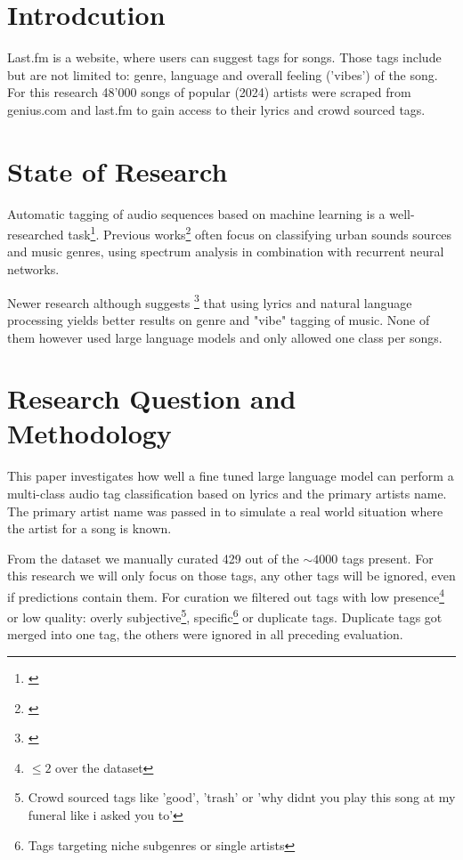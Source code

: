 \documentclass[a4paper,12pt]{scrartcl}
\begin{document}



\pagebreak
\begin{multicols}{2}
\section{Introdcution}
Last.fm is a website, where users can suggest tags for songs. Those tags include but are not limited to: genre, language and overall feeling ('vibes') of the song. For this research 48'000 songs of popular (2024) artists were scraped from genius.com and last.fm to gain access to their lyrics and crowd sourced tags.

\section{State of Research}
Automatic tagging of audio sequences based on machine learning is a well-researched task\footnote[1]{\cite{mckinney_features_2003}}. 
Previous works\footnote[2]{\cite{fonseca_audio_2020, pons_musicnn_2019, schmid_efficient_2023,xu_general_2019}} often focus on classifying urban sounds sources and music genres, using spectrum analysis in combination with recurrent neural networks. 

Newer research although suggests \footnote[3]{\cite{tsaptsinos_lyrics-based_2017, smith_your_2012, fell_lyrics-based_2014}} that using lyrics and natural language processing yields better results on genre and "vibe" tagging of music. None of them however used large language models and only allowed one class per songs.

\section{Research Question and Methodology}
This paper investigates how well a fine tuned large language model can perform a multi-class audio tag classification based on lyrics and the primary artists name. The primary artist name was passed in to simulate a real world situation where the artist for a song is known. 

From the dataset we manually curated 429 out of the $\sim{4000}$ tags present. For this research we will only focus on those tags, any other tags will be ignored, even if predictions contain them. For curation we filtered out tags with low presence\footnote[6]{$\leq 2$ over the dataset} or low quality: overly subjective\footnote[7]{Crowd sourced tags like 'good', 'trash' or 'why didnt you play this song at my funeral like i asked you to'}, specific\footnote[8]{Tags targeting niche subgenres or single artists} or duplicate tags. Duplicate tags got merged into one tag, the others were ignored in all preceding evaluation.


\end{multicols}
\end{document}
